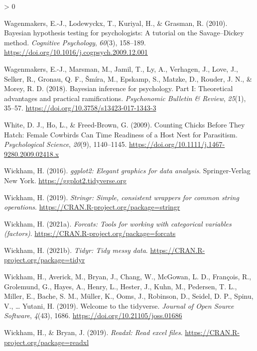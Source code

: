 \documentclass[
  english,
  ,doc,floatsintext]{apa6}
\newlength{\cslhangindent}
\newenvironment{CSLReferences}[2] %
 {%
  \setlength{\parindent}{0pt}
  \ifodd #1 \everypar{\setlength{\hangindent}{\cslhangindent}}\ignorespaces\fi
  \ifnum #2 > 0
  \setlength{\parskip}{#2\baselineskip}
  \fi
 }%
 {}
\begin{document}
\begin{CSLReferences}{1}{0}
\leavevmode\hypertarget{ref-Wagenmakers.etal.2010}{}%
Wagenmakers, E.-J., Lodewyckx, T., Kuriyal, H., \& Grasman, R. (2010). Bayesian hypothesis testing for psychologists: {A} tutorial on the {Savage}--{Dickey} method. \emph{Cognitive Psychology}, \emph{60}(3), 158--189. \url{https://doi.org/10.1016/j.cogpsych.2009.12.001}

\leavevmode\hypertarget{ref-Wagenmakers.etal.2018}{}%
Wagenmakers, E.-J., Marsman, M., Jamil, T., Ly, A., Verhagen, J., Love, J., Selker, R., Gronau, Q. F., Šmíra, M., Epskamp, S., Matzke, D., Rouder, J. N., \& Morey, R. D. (2018). Bayesian inference for psychology. {Part} {I}: {Theoretical} advantages and practical ramifications. \emph{Psychonomic Bulletin \& Review}, \emph{25}(1), 35--57. \url{https://doi.org/10.3758/s13423-017-1343-3}

\leavevmode\hypertarget{ref-White.etal.2009}{}%
White, D. J., Ho, L., \& Freed-Brown, G. (2009). Counting {Chicks} {Before} {They} {Hatch}: {Female} {Cowbirds} {Can} {Time} {Readiness} of a {Host} {Nest} for {Parasitism}. \emph{Psychological Science}, \emph{20}(9), 1140--1145. \url{https://doi.org/10.1111/j.1467-9280.2009.02418.x}

\leavevmode\hypertarget{ref-R-ggplot2}{}%
Wickham, H. (2016). \emph{ggplot2: Elegant graphics for data analysis}. Springer-Verlag New York. \url{https://ggplot2.tidyverse.org}

\leavevmode\hypertarget{ref-R-stringr}{}%
Wickham, H. (2019). \emph{Stringr: Simple, consistent wrappers for common string operations}. \url{https://CRAN.R-project.org/package=stringr}

\leavevmode\hypertarget{ref-R-forcats}{}%
Wickham, H. (2021a). \emph{Forcats: Tools for working with categorical variables (factors)}. \url{https://CRAN.R-project.org/package=forcats}

\leavevmode\hypertarget{ref-R-tidyr}{}%
Wickham, H. (2021b). \emph{Tidyr: Tidy messy data}. \url{https://CRAN.R-project.org/package=tidyr}

\leavevmode\hypertarget{ref-R-tidyverse}{}%
Wickham, H., Averick, M., Bryan, J., Chang, W., McGowan, L. D., François, R., Grolemund, G., Hayes, A., Henry, L., Hester, J., Kuhn, M., Pedersen, T. L., Miller, E., Bache, S. M., Müller, K., Ooms, J., Robinson, D., Seidel, D. P., Spinu, V., \ldots{} Yutani, H. (2019). Welcome to the {tidyverse}. \emph{Journal of Open Source Software}, \emph{4}(43), 1686. \url{https://doi.org/10.21105/joss.01686}

\leavevmode\hypertarget{ref-R-readxl}{}%
Wickham, H., \& Bryan, J. (2019). \emph{Readxl: Read excel files}. \url{https://CRAN.R-project.org/package=readxl}


\end{CSLReferences}
\end{document}
